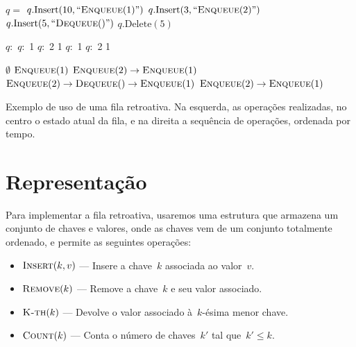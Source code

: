 \documentclass[../../main.tex]{subfiles}
\begin{document}
\begin{table}
\centering

\begin{subalgorithm}{0.34\textwidth}
\begin{algorithmic}

	\State $q =$ 
	\State $q.\text{Insert}(10, ``\Call{Enqueue}{1}")$
	\State $q.\text{Insert}(3, ``\Call{Enqueue}{2}")$
	\State $q.\text{Insert}(5, ``\Call{Dequeue}{\null}")$
	\State $q.\text{Delete}(5)$

\end{algorithmic}
\end{subalgorithm} \vrule
\begin{subalgorithm}{0.14\textwidth}
\begin{algorithmic}

	\State $q:$
	\State $q:$ 1
	\State $q:$ 2 1
	\State $q:$ 1
	\State $q:$ 2 1

\end{algorithmic}
\end{subalgorithm} \vrule
\begin{subalgorithm}{0.5\textwidth}
\begin{algorithmic}

	\State $\emptyset$
	\State $\Call{Enqueue}{1}$
	\State $\Call{Enqueue}{2} \rightarrow \Call{Enqueue}{1}$
	\State $\Call{Enqueue}{2} \rightarrow \Call{Dequeue}{\null} \rightarrow \Call{Enqueue}{1}$
	\State $\Call{Enqueue}{2} \rightarrow \Call{Enqueue}{1}$

\end{algorithmic}
\end{subalgorithm}
\caption{Exemplo de uso de uma fila retroativa. Na esquerda, as operações realizadas, no centro o estado atual da fila, e na direita a sequência de operações, ordenada por tempo.} \label{ex:fila_retro}
\end{table}

\section{Representação}

Para implementar a fila retroativa, usaremos uma estrutura que armazena um conjunto de chaves e valores, onde as chaves vem de um conjunto totalmente ordenado, e permite as seguintes operações:

\begin{itemize}
	\item $\Call{Insert}{k, v}$ --- Insere a chave~$k$ associada ao valor~$v$.
	\item $\Call{Remove}{k}$ --- Remove a chave~$k$ e seu valor associado.
	\item $\Call{K-th}{k}$ --- Devolve o valor associado à~$k$-ésima menor chave. %
	\item $\Call{Count}{k}$ --- Conta o número de chaves~$k'$ tal que~$k' \leq k$.
\end{itemize}
\end{document}
